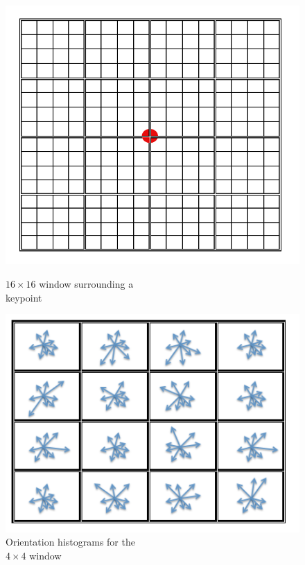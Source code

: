 \begin{figure}[ht!]
\centering
\begin{minipage}{.5\textwidth}
	\centering
	\includegraphics[width=.9\linewidth]{images/spacePartition.png}
	\caption{$16\times16$ window surrounding a\\ keypoint}
	\label{fig:spacePartition}
\end{minipage}%
\begin{minipage}{.5\textwidth}
	\centering
	\includegraphics[width=1.1\linewidth]{images/imageGradients.png}
	\caption{Orientation histograms for the\\$4\times4$ window}
	\label{fig:imageGradients}
\end{minipage}
\end{figure}

